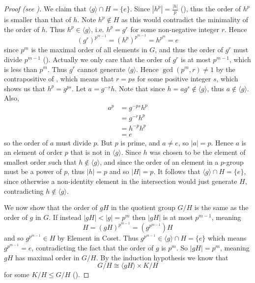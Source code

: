 \begin{proof}[Proof (see {\cite[Lemma 13.9]{judson_beezer_2022}})]
    We claim that $\langle g \rangle \cap H = \{e\}$. Since $|h^p| = \frac{|h|}{p}$ (), thus the order of $h^p$ is smaller than that of $h$. Note $h^p \notin H$ as this would contradict the minimality of the order of $h$. Thus $h^p \in \langle g \rangle$, i.e. $h^p = g^r$ for some non-negative integer $r$. Hence
    \[
        \left(g^r\right)^{p^{m-1}} = \left(h^p\right)^{p^{m-1}} = h^{p^m} = e
    \]
    since $p^m$ is the maximal order of all elements in $G$, and thus the order of $g^r$ must divide $p^{m-1}$ (). Actually we only care that the order of $g^r$ is at most $p^{m-1}$, which is less than $p^m$. Thus $g^r$ cannot generate $\langle g \rangle$. Hence $\gcd(p^m, r) \neq 1$ by the contrapositive of , which means that $r = ps$ for some positive integer $s$, which shows us that $h^p = g^{ps}$. Let $a = g^{-s}h$. Note that since $h = ag^{s} \notin \langle g \rangle$, thus $a \notin \langle g \rangle$. Also,
    \begin{align*}
        a^p &= g^{-ps}h^p\\
        &= g^{-r}h^p\\
        &= h^{-p}h^p\\
        &= e
    \end{align*}
    so the order of $a$ must divide $p$. But $p$ is prime, and $a \neq e$, so $|a| = p$. Hence $a$ is an element of order $p$ that is not in $\langle g \rangle$. Since $h$ was chosen to be the element of smallest order such that $h \notin \langle g \rangle$, and since the order of an element in a $p$-group must be a power of $p$, thus $|h| = p$ and so $|H| = p$. It follows that $\langle g\rangle \cap H = \{e\}$, since otherwise a non-identity element in the intersection would just generate $H$, contradicting $h \notin \langle g\rangle$.

    We now show that the order of $gH$ in the quotient group $G/H$ is the same as the order of $g$ in $G$. If instead $|gH| < |g| = p^m$ then $|gH|$ is at most $p^{m-1}$, meaning
    \[
        H = (gH)^{p^{m-1}} = (g^{p^{m-1}})H
    \]
    and so $g^{p^{m-1}} \in H$ by Element in Coset. Thus $g^{p^{m-1}} \in \langle g\rangle \cap H = \{e\}$ which means $g^{p^{m-1}} = e$, contradicting the fact that the order of $g$ is $p^m$. So $|gH| = p^m$, meaning $gH$ has maximal order in $G/H$. By the induction hypothesis we know that
    \[
        G/H \cong \langle gH \rangle \times K/H
    \]
    for some $K/H \leq G/H$ ().


\end{proof}

